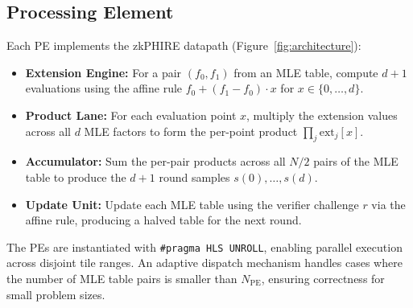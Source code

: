 \documentclass[conference]{IEEEtran}
\begin{document}
\subsection{Processing Element}

Each PE implements the zkPHIRE datapath (Figure~\ref{fig:architecture}):

\begin{itemize}
\item \textbf{Extension Engine:} For a pair $(f_0, f_1)$ from an MLE table, compute $d+1$ evaluations using the affine rule $f_0 + (f_1-f_0) \cdot x$ for $x \in \{0,\dots,d\}$.
\item \textbf{Product Lane:} For each evaluation point $x$, multiply the extension values across all $d$ MLE factors to form the per-point product $\prod_j \text{ext}_j[x]$.
\item \textbf{Accumulator:} Sum the per-pair products across all $N/2$ pairs of the MLE table to produce the $d+1$ round samples $s(0),\dots,s(d)$.
\item \textbf{Update Unit:} Update each MLE table using the verifier challenge $r$ via the affine rule, producing a halved table for the next round.
\end{itemize}

The PEs are instantiated with \texttt{\#pragma HLS UNROLL}, enabling parallel execution across disjoint tile ranges. An adaptive dispatch mechanism handles cases where the number of MLE table pairs is smaller than $N_{\mathrm{PE}}$, ensuring correctness for small problem sizes.
\end{document}
